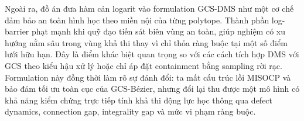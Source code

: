 Ngoài ra, đồ án đưa hàm cản logarit vào formulation GCS-DMS như một cơ chế đảm bảo an toàn hình học theo miền nội của từng polytope. Thành phần log-barrier phạt mạnh khi quỹ đạo tiến sát biên vùng an toàn, giúp nghiệm có xu hướng nằm sâu trong vùng khả thi thay vì chỉ thỏa ràng buộc tại một số điểm lưới hữu hạn. Đây là điểm khác biệt quan trọng so với các cách tích hợp DMS với GCS theo kiểu hậu xử lý hoặc chỉ áp đặt containment bằng sampling rời rạc. Formulation này đồng thời làm rõ sự đánh đổi: ta mất cấu trúc lồi MISOCP và bảo đảm tối ưu toàn cục của GCS-Bézier, nhưng đổi lại thu được một mô hình có khả năng kiểm chứng trực tiếp tính khả thi động lực học thông qua defect dynamics, connection gap, integrality gap và mức vi phạm ràng buộc.
